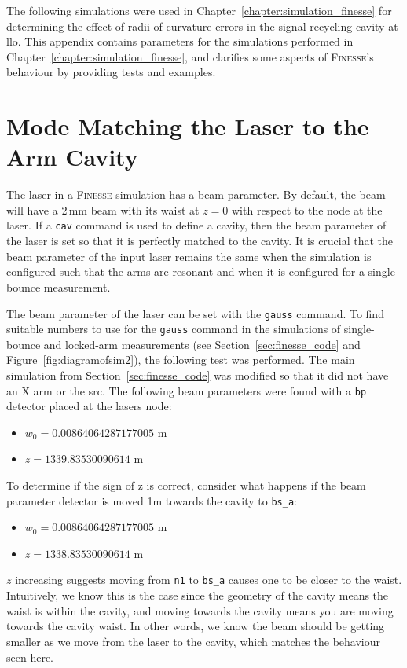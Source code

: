 The following simulations were used in Chapter~\ref{chapter:simulation_finesse} for determining the effect of radii of curvature errors in the signal recycling cavity at \gls{llo}. This appendix contains parameters for the simulations performed in Chapter~\ref{chapter:simulation_finesse}, and clarifies some aspects of \textsc{Finesse}'s behaviour by providing tests and examples.
\section{Mode Matching the Laser to the Arm Cavity}
\label{sec:mode_match_to_arm}
The laser in a \textsc{Finesse} simulation has a beam parameter. By default, the beam will have a 2\,mm beam with its waist at $z = 0$ with respect to the node at the laser. If a \texttt{cav} command is used to define a cavity, then the beam parameter of the laser is set so that it is perfectly matched to the cavity. It is crucial that the beam parameter of the input laser remains the same when the simulation is configured such that the arms are resonant and when it is configured for a single bounce measurement. 
\par
The beam parameter of the laser can be set with the \texttt{gauss} command. To find suitable numbers to use for the \texttt{gauss} command in the simulations of single-bounce and locked-arm measurements (see Section~\ref{sec:finesse_code} and Figure~\ref{fig:diagramofsim2}), the following test was performed. The main simulation from Section~\ref{sec:finesse_code} was modified so that it did not have an X arm or the \gls{src}. The following beam parameters were found with a \texttt{bp} detector placed at the lasers node:
\setlength{\parskip}{0em}
\begin{itemize}
	\item $w_0 = 0.00864064287177005$ m
	\item $z = 1339.83530090614$ m
\end{itemize}
\par
To determine if the sign of z is correct, consider what happens if the beam parameter detector is moved 1m towards the cavity to \verb|bs_a|:
\begin{itemize}
	\item $w_0 = 0.00864064287177005$ m
	\item $z = 1338.83530090614$ m
\end{itemize}
$z$ increasing suggests moving from \verb|n1| to \verb|bs_a| causes one to be closer to the waist. Intuitively, we know this is the case since the geometry of the cavity means the waist is within the cavity, and moving towards the cavity means you are moving towards the cavity waist. In other words, we know the beam should be getting smaller as we move from the laser to the cavity, which matches the behaviour seen here.
